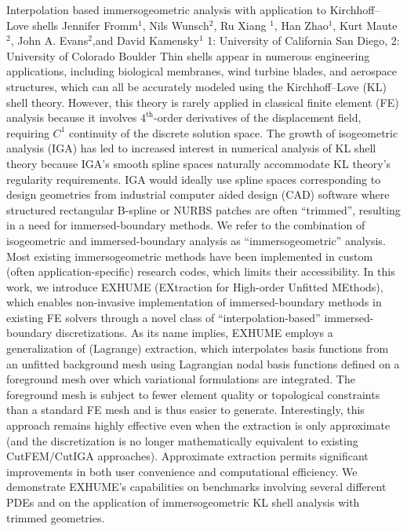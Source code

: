 \begin{addmargin}[2em]{0em}
\vspace{1.5ex}
\abs
{Interpolation based immersogeometric analysis with application to Kirchhoff--Love shells}
{Jennifer Fromm$^{1}$, Nils Wunsch$^{2}$,  Ru Xiang $^{1}$, Han Zhao$^{1}$, Kurt Maute$^{2}$, John A. Evans$^{2}$,and David Kamensky$^{1}$}
{1: University of California San Diego, 2: University of Colorado Boulder}
{Thin shells appear in numerous engineering applications, including biological membranes, wind turbine blades, and aerospace structures, which can all be accurately modeled using the Kirchhoff--Love (KL) shell theory.
 However, this theory is rarely applied in classical finite element (FE) analysis because it involves $4^{\text{th}}$-order derivatives of the displacement field, requiring $C^1$ continuity of the discrete solution space.
 The growth of isogeometric analysis (IGA) has led to increased interest in numerical analysis of KL shell theory  because IGA's smooth spline spaces naturally accommodate KL theory's regularity requirements.
 IGA would ideally use spline spaces corresponding to design geometries from industrial computer aided design (CAD) software where structured rectangular B-spline or NURBS patches are often ``trimmed'', resulting in a need for immersed-boundary methods.
 We refer to the combination of isogeometric and immersed-boundary analysis as ``immersogeometric'' analysis.
 Most existing immersogeometric methods have been implemented in custom (often application-specific) research codes, which limits their accessibility.
 In this work, we introduce EXHUME (EXtraction for High-order Unfitted MEthods), which enables non-invasive implementation of immersed-boundary methods in existing FE solvers through a novel class of ``interpolation-based'' immersed-boundary discretizations.
 As its name implies, EXHUME employs a generalization of (Lagrange) extraction, which interpolates basis functions from an unfitted background mesh using Lagrangian nodal basis functions defined on a foreground mesh over which variational formulations are integrated.
 The foreground mesh is subject to fewer element quality or topological constraints than a standard FE mesh and is thus easier to generate.
 Interestingly, this approach remains highly effective even when the extraction is only approximate (and the discretization is no longer mathematically equivalent to existing CutFEM/CutIGA approaches).  Approximate extraction permits significant improvements in both user convenience and computational efficiency.
 We demonstrate EXHUME's capabilities on benchmarks involving several different PDEs and on the application of immersogeometric KL shell analysis with trimmed geometries.}



\end{addmargin}
